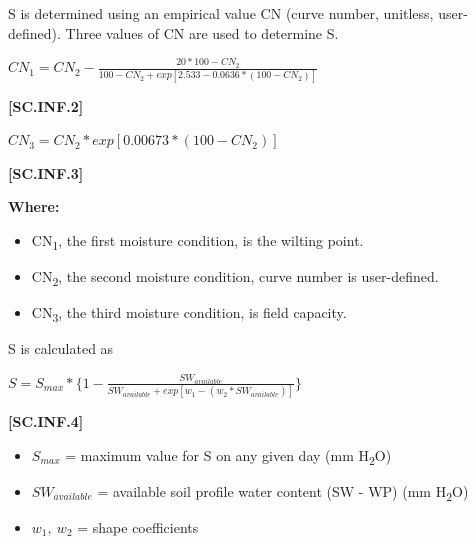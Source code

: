 S is determined using an empirical value CN (curve number, unitless, user-defined). Three values of CN are used to determine S.
            \vspace{0.5cm}

    \begin{center}
\(CN_1=CN_2-\frac{20 * 100-CN_2}{100-CN_2+exp[2.533-0.0636 * (100-CN_2)]}	\)
    \end{center}
        \vspace{0.5cm} 
    
            {\raggedleft \textbf{[SC.INF.2]}\par}
            \vspace{0.5cm}

    \begin{center}
\(CN_3=CN_2 * exp [0.00673 * (100-CN_2)]\)
    \end{center}
        \vspace{0.5cm} 
    
            {\raggedleft \textbf{[SC.INF.3]}\par}
            \vspace{0.5cm}

        \textbf{Where:}
            
        \begin{itemize}
            \item CN\textsubscript{1}, the first moisture condition, is the wilting point.
            \item CN\textsubscript{2}, the second moisture condition, curve number is user-defined. 
            \item CN\textsubscript{3}, the third moisture condition, is field capacity. 
        \end{itemize}
\vspace{0.2cm}

S is calculated as
            \vspace{0.5cm}

    \begin{center}
 \( S=S_{max} * \{ 1-\frac{SW_{available}} {SW_{available}+exp[w_1- (w_2 * SW_{available})]} \} \)
    \end{center}
        \vspace{0.5cm} 
    
            {\raggedleft \textbf{[SC.INF.4]}\par}
            \vspace{0.5cm}
            
        \begin{itemize}
            \item \(S_{max}\) =	maximum value for S on any given day (mm H\textsubscript{2}O) 
            \item \(SW_{available}\)	=	available soil profile water content (SW - WP) (mm H\textsubscript{2}O)
            \item \(w_{1},\ w_2\) =	shape coefficients
        \end{itemize}
\vspace{0.2cm}

